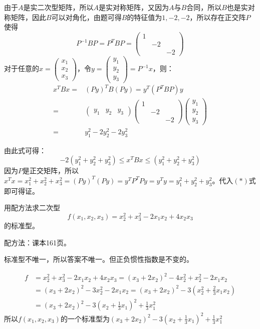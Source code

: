 \documentclass[a4paper]{report}
\begin{document}
\begin{zhengming}
由于$A$是实二次型矩阵，所以$A$是实对称矩阵，又因为$A$与$B$合同，所以$B$也是实对称矩阵，因此$B$可以对角化，由题可得$B$的特征值为$1,-2,-2$，所以存在正交阵$P$使得
\begin{equation*}
P^{-1}BP=P^TBP=
\begin{pmatrix}
1\\&-2\\&&-2
\end{pmatrix}
\end{equation*}
对于任意的$x=
\begin{pmatrix}
x_1\\x_2\\x_3
\end{pmatrix}
$，令$
y=\begin{pmatrix}
y_1\\y_2\\y_3
  \end{pmatrix}=P^{-1}x
$，则：
\begin{align*}
x^TBx=&(Py)^TB(Py)=y^T(P^TBP)y\\
=&\begin{pmatrix}
y_1&y_2&y_3
  \end{pmatrix}\begin{pmatrix}
1\\&-2\\&&-2
\end{pmatrix}\begin{pmatrix}
y_1\\ y_2\\ y_3
  \end{pmatrix}\\=&
  y_1^2-2y_2^2-2y_3^2
\end{align*}

由此式可得：\begin{equation*}-2(y_1^2+y_2^2+y_3^2)\leq x^TBx\leq(y_1^2+y_2^2+y_3^2)\tag{*}\end{equation*}
因为$P$是正交矩阵，所以$x^Tx=x_1^2+x_2^2+x_3^2=(Py)^{T}(Py)=y^TP^TPy=y^Ty=y_1^2+y_2^2+y_3^2$。代入$(*)$式即可得证。
\end{zhengming}

\EX 用配方法求二次型
\begin{equation*}
f(x_1,x_2,x_3)=x_2^2+x_3^2-2x_1x_2+4x_2x_3
\end{equation*}的标准型。

\begin{jie}
\textcolor[rgb]{1.00,0.00,0.00}{配方法：课本161页。}

标准型不唯一，所以答案不唯一。但正负惯性指数是不变的。

\begin{align*}
f&=x_2^2+x_3^2-2x_1x_2+4x_2x_3=(x_3+2x_2)^2-4x_2^2+x_2^2-2x_1x_2\\
&=(x_3+2x_2)^2-3x_2^2-2x_1x_2=(x_3+2x_2)^2-3(x_2^2+\frac{2}{3}x_1x_2)\\
&=(x_3+2x_2)^2-3(x_2+\frac{1}{3}x_1)^2+\frac{1}{3}x_1^2
\end{align*}
所以$f(x_1,x_2,x_3)$的一个标准型为$(x_3+2x_2)^2-3(x_2+\frac{1}{3}x_1)^2+\frac{1}{3}x_1^2$
\end{jie}
\end{document}
